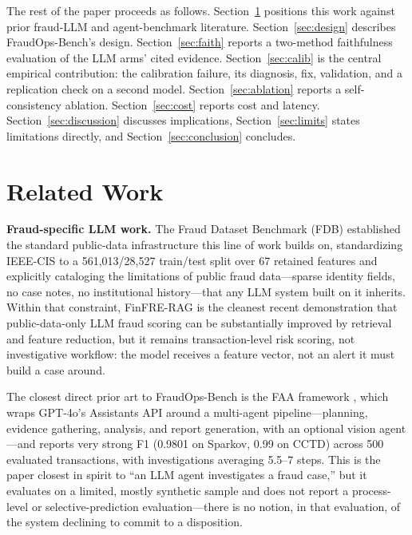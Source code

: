 \documentclass[]{ieeeaccess}
\begin{document}
The rest of the paper proceeds as follows. Section~\ref{sec:related} positions this work
against prior fraud-LLM and agent-benchmark literature. Section~\ref{sec:design}
describes FraudOps-Bench's design. Section~\ref{sec:faith} reports a two-method
faithfulness evaluation of the LLM arms' cited evidence. Section~\ref{sec:calib} is the
central empirical contribution: the calibration failure, its diagnosis,
fix, validation, and a replication check on a second model. Section~\ref{sec:ablation}
reports a self-consistency ablation. Section~\ref{sec:cost} reports cost and latency.
Section~\ref{sec:discussion} discusses implications, Section~\ref{sec:limits} states limitations directly,
and Section~\ref{sec:conclusion} concludes.

\section{Related Work}\label{sec:related}

\textbf{Fraud-specific LLM work.} The Fraud Dataset Benchmark (FDB)
\cite{fdb2022} established the standard public-data infrastructure this
line of work builds on, standardizing IEEE-CIS to a 561{,}013/28{,}527
train/test split over 67 retained features and explicitly cataloging the
limitations of public fraud data---sparse identity fields, no case
notes, no institutional history---that any LLM system built on it
inherits. Within that constraint, FinFRE-RAG \cite{finfrerag2025} is the
cleanest recent demonstration that public-data-only LLM fraud scoring can
be substantially improved by retrieval and feature reduction, but it
remains transaction-level risk scoring, not investigative workflow: the
model receives a feature vector, not an alert it must build a case
around.

The closest direct prior art to FraudOps-Bench is the FAA framework
\cite{faa2025}, which wraps GPT-4o's Assistants API around a multi-agent
pipeline---planning, evidence gathering, analysis, and report
generation, with an optional vision agent---and reports very strong F1
(0.9801 on Sparkov, 0.99 on CCTD) across 500 evaluated transactions, with
investigations averaging 5.5--7 steps. This is the paper closest in
spirit to ``an LLM agent investigates a fraud case,'' but it evaluates on
a limited, mostly synthetic sample and does not report a process-level or
selective-prediction evaluation---there is no notion, in that
evaluation, of the system declining to commit to a disposition.
\end{document}
